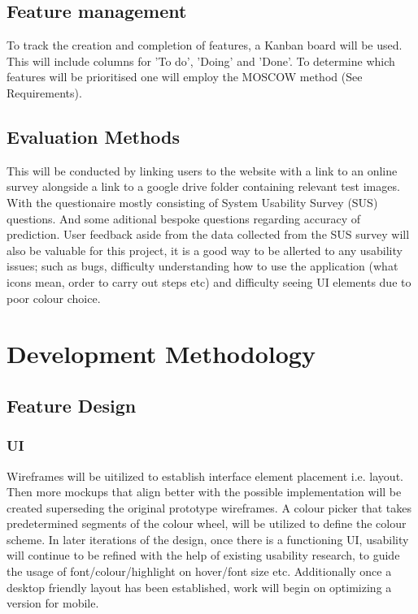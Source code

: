   \subsection{Feature management}
    To track the creation and completion of features, a Kanban board will be used. This will include columns for 'To do', 'Doing' and 'Done'.
    To determine which features will be prioritised one will employ the MOSCOW method (See Requirements).


  \subsection{Evaluation Methods}
    This will be conducted by linking users to the website with a link to an online survey alongside a link to a google drive folder containing relevant test images. With the questionaire mostly consisting of System Usability Survey (SUS) questions. And some aditional bespoke questions regarding accuracy of prediction. User feedback aside from the data collected from the SUS survey will also be valuable for this project, it is a good way to be allerted to any usability issues; such as bugs, difficulty understanding how to use the application (what icons mean, order to carry out steps etc) and difficulty seeing UI elements due to poor colour choice.

\section{Development Methodology}
  \subsection{Feature Design}
    \subsubsection{UI}
      Wireframes will be uitilized to establish interface element placement i.e. layout. Then more mockups that align better with the possible implementation will be created superseding the original prototype wireframes. A colour picker that takes predetermined segments of the colour wheel, will be utilized to define the colour scheme. In later iterations of the design, once there is a functioning UI, usability will continue to be refined with the help of existing usability research, to guide the usage of font/colour/highlight on hover/font size etc. Additionally once a desktop friendly layout has been established, work will begin on optimizing a version for mobile.
